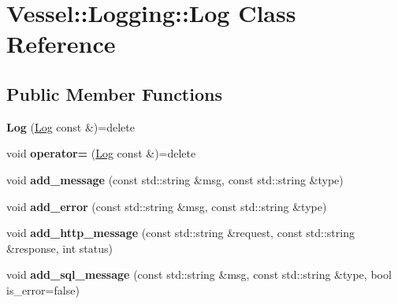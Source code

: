 \hypertarget{class_vessel_1_1_logging_1_1_log}{}\section{Vessel\+:\+:Logging\+:\+:Log Class Reference}
\label{class_vessel_1_1_logging_1_1_log}
\subsection*{Public Member Functions}
\begin{DoxyCompactItemize}
\item 
\mbox{\label{class_vessel_1_1_logging_1_1_log_a1efbbd38289c6c5408c763496328cc83}} 
{\bfseries Log} (\hyperlink{class_vessel_1_1_logging_1_1_log}{Log} const \&)=delete
\item 
\mbox{\label{class_vessel_1_1_logging_1_1_log_a13b25b6f58b6d14e3eb2925f2eaafd26}} 
void {\bfseries operator=} (\hyperlink{class_vessel_1_1_logging_1_1_log}{Log} const \&)=delete
\item 
\mbox{\label{class_vessel_1_1_logging_1_1_log_a836168fc70cf2f6901b42375644eb357}} 
void {\bfseries add\+\_\+message} (const std\+::string \&msg, const std\+::string \&type)
\item 
\mbox{\label{class_vessel_1_1_logging_1_1_log_a835a3c775891e4b37a3363b9dc656bdf}} 
void {\bfseries add\+\_\+error} (const std\+::string \&msg, const std\+::string \&type)
\item 
\mbox{\label{class_vessel_1_1_logging_1_1_log_a7fb574e36c7728c8e8e18d7926509ea8}} 
void {\bfseries add\+\_\+http\+\_\+message} (const std\+::string \&request, const std\+::string \&response, int status)
\item 
\mbox{\label{class_vessel_1_1_logging_1_1_log_a4ab1d8a2eee54eabb36e4e11b66d2ef0}} 
void {\bfseries add\+\_\+sql\+\_\+message} (const std\+::string \&msg, const std\+::string \&type, bool is\+\_\+error=false)
\item 
\mbox{\label{class_vessel_1_1_logging_1_1_log_a85b0112150cb93282451f88602060ecb}} 

\end{DoxyCompactItemize}
